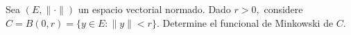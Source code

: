 Sea $(E,\|\cdot\|)$ un espacio vectorial normado. Dado $r>0,$ considere $C=B(0,r)=\{y\in E:\|y\|<r\}.$ Determine el funcional de Minkowski de $C.$
